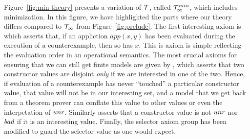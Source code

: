 Figure~\ref{fig:min-theory} presents a variation of ${\cal T}$, called ${\cal T}_{\infty}^{min}$, which includes minimization.
In this figure, we have highlighted the parts where our theory differs compared to ${\cal T}_\infty$ from
Figure~\ref{fig:prelude}. The first interesting axiom is  which asserts that, if an 
appliction $app(x,y)$ has been evaluated during the execution of a counterexample, then so has $x$. This
is axiom is simple reflecting the evaluation order in an operational semantics. The most crucial axioms for
ensuring that we can still get finite models are given by , which asserts that two constructor
values are disjoint {\em only} if we are interested in one of the two. Hence, if evaluation of a counterexample
has never ``touched'' a particular constructor value, that value will not be in our interesting set, and a model
that we get back from a theorem prover can conflate this value to other values or even the interpetation of $\mathop{unr}$.
Similarly  asserts that a constructor value is not $\mathop{unr}$ nor $\mathop{bad}$ if it is an interesting value. 
Finally, the selector axiom group  has been modified to guard the selector value as one would expect.


